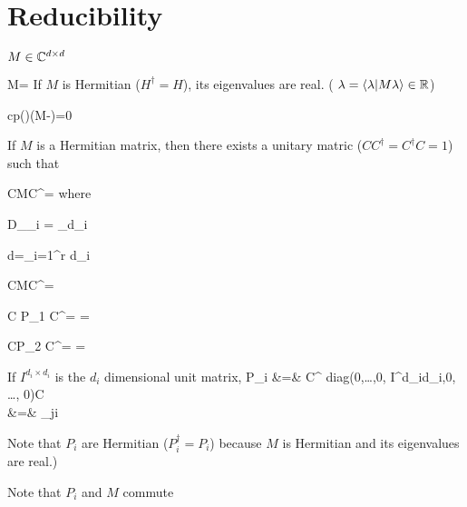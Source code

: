 \chapter{Reducibility}
\label{ch-reducibility}

$M\in { \mathbb{C}}^{d\times d }$

\beq
M=\lam {}
\eeq
If $M$ is Hermitian ($H^\dagger=H$), its eigenvalues are real. ( $\lambda =
\left\langle\lambda|M\lambda\right\rangle\in{ \mathbb{R}}$)


\beq
cp(\lam)\eqdef \det(M-\lam)=0
\eeq

If $M$ is a Hermitian  matrix, then there exists
a unitary matric ($CC^\dagger = C^\dagger C =1$)
such that

\beq
CMC^\dagger=
\eeq
where

\beq
D_{\lam_i} =
_{d_i}
\eeq

\beq
d=\sum_{i=1}^r d_i
\eeq


\beq
CMC^\dagger =
\eeq

\beq
C P_1 C^\dagger=
\left[
\begin{array}{cc}
1&0
\\
0&0
\end{array}
\right]
=
\eeq

\beq
CP_2 C^\dagger =
\left[
\begin{array}{cc}
0&0
\\
0&1
\end{array}
\right]
=
\eeq

If $I^{d_i\times d_i}$
is the $d_i$
dimensional unit matrix,
\beqa
P_i &=&
C^\dagger
diag(0,\ldots,0, I^{d_i\times d_i},0, \dots, 0)C
\\
&=&
\prod_{j\neq i}
\eeqa

Note that $P_i$ are Hermitian
($P_i^\dagger = P_i$)
because $M$
is Hermitian and
its eigenvalues are real.)

Note that
$P_i$ and $M$
commute

